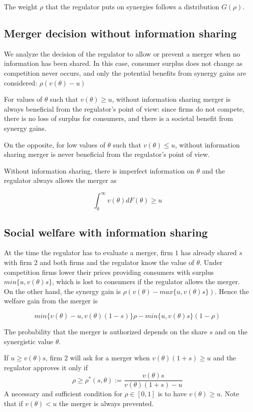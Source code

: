 \documentclass[a4paper,leqno]{article}%
\renewcommand{\t}{\theta}
\begin{document}
The weight $\rho$ that the regulator puts on synergies follows a distribution $G(\rho)$.


\subsection{Merger decision without information sharing}

We analyze the decision of the regulator to allow or prevent a merger when no information has been shared. In this case, consumer surplus does not change as competition never occurs, and only the potential benefits from synergy gains are considered: $\rho (v(\t)-u)$

For values of $\t$ such that $v(\t)\geq u$, without information sharing merger is always beneficial from the regulator's point of view: since firms do not compete, there is no loss of surplus for consumers, and there is a societal benefit from synergy gains.

On the opposite, for low values of $\t$ such that $v(\t)\leq u$, without information sharing merger is never beneficial from the regulator's point of view.

Without information sharing, there is imperfect information on $\t$ and the regulator always allows the merger as 

\[
\int_{0}^{\infty}v(\t)dF(\t)\geq u
\]

\medskip

\subsection{Social welfare with information sharing}

\medskip

At the time the regulator has to evaluate a merger, firm $1$ has already shared $s$ with firm $2$ and both firms and the regulator know the value of $\t$. Under competition firms lower their prices providing consumers with surplus $min\{u,v(\t)s\}$, which is lost to consumers if the regulator allows the merger. On the other hand, the synergy gain is $\rho (v(\t)-max\{u,v(\t)s\})$. Hence the welfare gain from the merger is

\[
min\{v(\t)-u,v(\t)(1-s)\}\rho-min\{u,v(\t)s\}(1-\rho)
\]




The probability that the merger is authorized depends on the share $s$ and on the synergistic value $\t$. 

If $u\geq v(\t)s$, firm 2 will ask for a merger when $v(\t)(1+s)\geq u$ and the regulator approves it only if  
    \begin{equation}
           \rho\geq \rho^*(s,\t):=\frac{v(\t)s}{v(\t)(1+s)-u}
    \end{equation}
A necessary and sufficient condition for $\rho\in[0,1]$ is to have $v(\t)\geq u$. Note that if $v(\t)<u$ the merger is always prevented.
\end{document}

